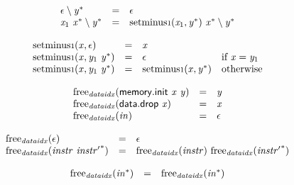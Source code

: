 \vspace{1ex}

$$
\begin{array}{@{}lcl@{}l@{}}
\epsilon \setminus {{\mathit{y}}^\ast} &=& \epsilon &  \\
{\mathit{x}}_{{1}}~{{\mathit{x}}^\ast} \setminus {{\mathit{y}}^\ast} &=& {\mathrm{setminus{\scriptstyle1}}}({\mathit{x}}_{{1}}, {{\mathit{y}}^\ast})~{{\mathit{x}}^\ast} \setminus {{\mathit{y}}^\ast} &  \\
\end{array}
$$

$$
\begin{array}{@{}lcl@{}l@{}}
{\mathrm{setminus{\scriptstyle1}}}({\mathit{x}}, \epsilon) &=& {\mathit{x}} &  \\
{\mathrm{setminus{\scriptstyle1}}}({\mathit{x}}, {\mathit{y}}_{{1}}~{{\mathit{y}}^\ast}) &=& \epsilon &\quad
  \mbox{if}~{\mathit{x}} = {\mathit{y}}_{{1}} \\
{\mathrm{setminus{\scriptstyle1}}}({\mathit{x}}, {\mathit{y}}_{{1}}~{{\mathit{y}}^\ast}) &=& {\mathrm{setminus{\scriptstyle1}}}({\mathit{x}}, {{\mathit{y}}^\ast}) &\quad
  \mbox{otherwise} \\
\end{array}
$$

\vspace{1ex}

$$
\begin{array}{@{}lcl@{}l@{}}
{\mathrm{free}}_{{\mathit{dataidx}}}(\mathsf{memory.init}~{\mathit{x}}~{\mathit{y}}) &=& {\mathit{y}} &  \\
{\mathrm{free}}_{{\mathit{dataidx}}}(\mathsf{data.drop}~{\mathit{x}}) &=& {\mathit{x}} &  \\
{\mathrm{free}}_{{\mathit{dataidx}}}({\mathit{in}}) &=& \epsilon &  \\
\end{array}
$$

$$
\begin{array}{@{}lcl@{}l@{}}
{\mathrm{free}}_{{\mathit{dataidx}}}(\epsilon) &=& \epsilon &  \\
{\mathrm{free}}_{{\mathit{dataidx}}}({\mathit{instr}}~{{\mathit{instr}'}^\ast}) &=& {\mathrm{free}}_{{\mathit{dataidx}}}({\mathit{instr}})~{\mathrm{free}}_{{\mathit{dataidx}}}({{\mathit{instr}'}^\ast}) &  \\
\end{array}
$$

$$
\begin{array}{@{}lcl@{}l@{}}
{\mathrm{free}}_{{\mathit{dataidx}}}({{\mathit{in}}^\ast}) &=& {\mathrm{free}}_{{\mathit{dataidx}}}({{\mathit{in}}^\ast}) &  \\
\end{array}
$$

